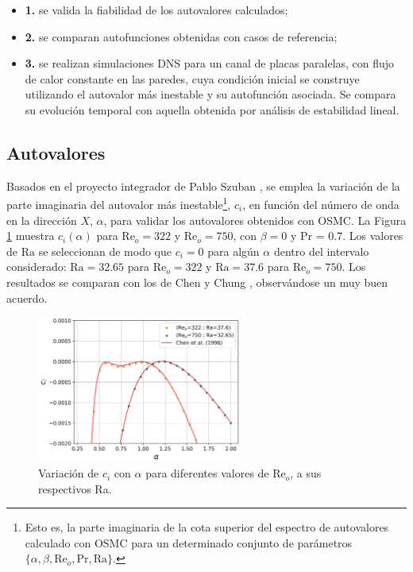 \begin{itemize}
	\item \textbf{1.} se valida la fiabilidad de los autovalores calculados;
	\item \textbf{2.} se comparan autofunciones obtenidas con casos de referencia;
	\item \textbf{3.} se realizan simulaciones DNS para un canal de placas paralelas, con flujo de calor constante en las paredes, cuya condición inicial se construye utilizando el autovalor más inestable y su autofunción asociada. Se compara su evolución temporal con aquella obtenida por análisis de estabilidad lineal.
\end{itemize}

\subsection{Autovalores}

Basados en el proyecto integrador de Pablo Szuban \cite{szuban2023}, se emplea la variación de la parte imaginaria del autovalor más inestable\footnote{Esto es, la parte imaginaria de la cota superior del espectro de autovalores calculado con OSMC para un determinado conjunto de parámetros $\lbrace \alpha, \beta, \text{Re}_o, \text{Pr}, \text{Ra} \rbrace$.}, $c_i$, en función del número de onda en la dirección $X$, $\alpha$, para validar los autovalores obtenidos con OSMC. La Figura \ref{fig:eigenval_alpha} muestra $c_i(\alpha)$ para $\mathrm{Re}_o=322$ y $\mathrm{Re}_o=750$, con $\beta=0$ y Pr = 0.7. Los valores de $\mathrm{Ra}$ se seleccionan de modo que $c_i=0$ para algún $\alpha$ dentro del intervalo considerado: $\mathrm{Ra}=32$.$65$ para $\mathrm{Re}_o=322$ y $\mathrm{Ra}=37$.$6$ para $\mathrm{Re}_o=750$. Los resultados se comparan con los de Chen y Chung \cite{chen1996linear}, observándose un muy buen acuerdo.

\begin{figure}[H]
	 \centering
    	\includegraphics[width=0.6\textwidth]{figures/cap4/osmc/eigenvalues.png}
	 \caption{Variación de $c_i$ con $\alpha$ para diferentes valores de Re$_o$, a sus respectivos Ra.} 
 \label{fig:eigenval_alpha}
\end{figure}


